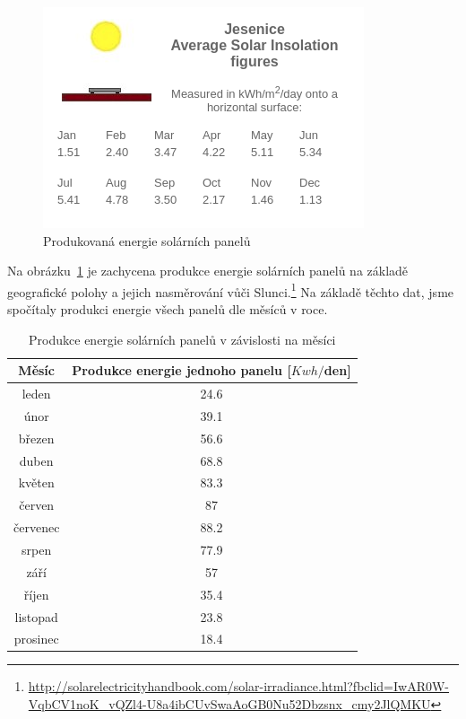 \begin{figure}[H]
    \centering
    \includegraphics[width=.40\textwidth]{images/solar_energy.png}\hfill
    \caption{Produkovaná energie solárních panelů}
    \label{fig:solar_energy}
\end{figure}

Na obrázku~\ref{fig:solar_energy} je zachycena produkce energie solárních panelů na základě geografické polohy a jejich nasměrování vůči Slunci.\footnote{\url{http://solarelectricityhandbook.com/solar-irradiance.html?fbclid=IwAR0W-VqbCV1noK_vQZl4-U8a4ibCUvSwaAoGB0Nu52Dbzsnx_cmy2JlQMKU}} Na základě těchto dat, jsme spočítaly produkci energie všech panelů dle měsíců v roce.

\begin{center}
    \begin{table}[H]
        \centering
        \begin{tabular}{|c|c|}
            \hline
            Měsíc & Produkce energie jednoho panelu [$Kwh/$den] \\
            \hline
            \hline
            leden & 24.6 \\
            \hline
            únor & 39.1 \\
            \hline
            březen & 56.6 \\
            \hline
            duben & 68.8 \\
            \hline
            květen & 83.3 \\
            \hline
            červen & 87 \\
            \hline
            červenec & 88.2 \\
            \hline
            srpen & 77.9 \\
            \hline
            září & 57 \\
            \hline
            říjen & 35.4 \\
            \hline
            listopad & 23.8 \\
            \hline
            prosinec & 18.4 \\
            \hline
        \end{tabular}
        \caption{Produkce energie solárních panelů v závislosti na měsíci}
    \end{table}
\end{center}


